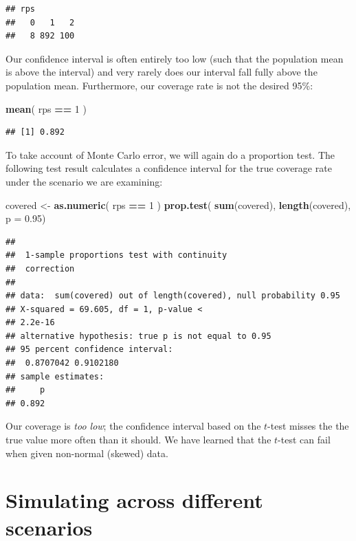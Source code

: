 \documentclass[
]{book}
\newenvironment{Shaded}{\begin{snugshade}}{\end{snugshade}}
\newcommand{\AttributeTok}[1]{\textcolor[rgb]{0.13,0.29,0.53}{#1}}
\newcommand{\DecValTok}[1]{\textcolor[rgb]{0.00,0.00,0.81}{#1}}
\newcommand{\FloatTok}[1]{\textcolor[rgb]{0.00,0.00,0.81}{#1}}
\newcommand{\FunctionTok}[1]{\textcolor[rgb]{0.13,0.29,0.53}{\textbf{#1}}}
\newcommand{\NormalTok}[1]{#1}
\newcommand{\OtherTok}[1]{\textcolor[rgb]{0.56,0.35,0.01}{#1}}
\newcommand{\SpecialCharTok}[1]{\textcolor[rgb]{0.81,0.36,0.00}{\textbf{#1}}}
\begin{document}
\begin{verbatim}
## rps
##   0   1   2 
##   8 892 100
\end{verbatim}

Our confidence interval is often entirely too low (such that the population mean is above the interval) and very rarely does our interval fall fully above the population mean.
Furthermore, our coverage rate is not the desired 95\%:

\begin{Shaded}
\begin{Highlighting}[]
\FunctionTok{mean}\NormalTok{( rps }\SpecialCharTok{==} \DecValTok{1}\NormalTok{ )}
\end{Highlighting}
\end{Shaded}

\begin{verbatim}
## [1] 0.892
\end{verbatim}

To take account of Monte Carlo error, we will again do a proportion test.
The following test result calculates a confidence interval for the true coverage rate under the scenario we are examining:

\begin{Shaded}
\begin{Highlighting}[]
\NormalTok{covered }\OtherTok{\textless{}{-}} \FunctionTok{as.numeric}\NormalTok{( rps }\SpecialCharTok{==} \DecValTok{1}\NormalTok{ )}
\FunctionTok{prop.test}\NormalTok{( }\FunctionTok{sum}\NormalTok{(covered), }\FunctionTok{length}\NormalTok{(covered), }\AttributeTok{p =} \FloatTok{0.95}\NormalTok{)}
\end{Highlighting}
\end{Shaded}

\begin{verbatim}
## 
##  1-sample proportions test with continuity
##  correction
## 
## data:  sum(covered) out of length(covered), null probability 0.95
## X-squared = 69.605, df = 1, p-value <
## 2.2e-16
## alternative hypothesis: true p is not equal to 0.95
## 95 percent confidence interval:
##  0.8707042 0.9102180
## sample estimates:
##     p 
## 0.892
\end{verbatim}

Our coverage is \emph{too low}; the confidence interval based on the \(t\)-test misses the the true value more often than it should.
We have learned that the \(t\)-test can fail when given non-normal (skewed) data.

\section{Simulating across different scenarios}\label{simulating-across-different-scenarios}
\end{document}
